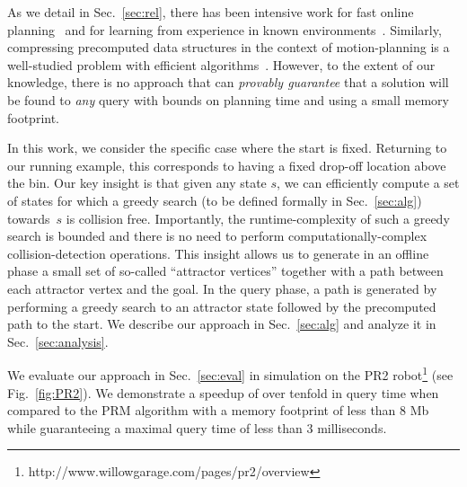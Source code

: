 \documentclass[letterpaper]{article} %
\begin{document}
As we detail in Sec.~\ref{sec:rel}, there has been intensive work 
for fast online planning~\cite{LA18} and 
for learning from experience in known environments~\cite{PCCL12,PDCL13,BAG12,CSMOC15}.
Similarly, compressing precomputed data structures in the context of motion-planning is a well-studied problem with efficient algorithms~\cite{SSAH14,DB14}.
However, to the extent of our knowledge, there is no approach that can \emph{provably guarantee} that a solution will be found to \emph{any} query with bounds on planning time and using a small memory footprint.


In this work, we consider the specific case where the start is fixed. Returning to our running example, this corresponds to having a fixed drop-off location above the bin.
%
Our key insight is that given any state $s$, we can efficiently compute a set of states for which a greedy search (to be defined formally in Sec.~\ref{sec:alg}) towards~$s$ is collision free.
Importantly, the runtime-complexity of such a greedy search is bounded and there is no need to perform computationally-complex collision-detection operations. 
This insight allows us to generate in an offline phase a small set of so-called ``attractor vertices'' together with a path between each attractor vertex and the goal.
In the query phase, a path is generated by performing a greedy search to an attractor state followed by the precomputed path to the start.
We describe our approach in Sec.~\ref{sec:alg} and analyze it in Sec.~\ref{sec:analysis}.


We evaluate our approach in Sec.~\ref{sec:eval} in simulation on the PR2 robot\footnote{http://www.willowgarage.com/pages/pr2/overview} (see Fig.~\ref{fig:PR2}).
We demonstrate a speedup of over tenfold in query time when compared to the \textsf{PRM} algorithm with a memory footprint of less than 8 Mb while guaranteeing a maximal query time of less than 3 milliseconds.

\end{document}
